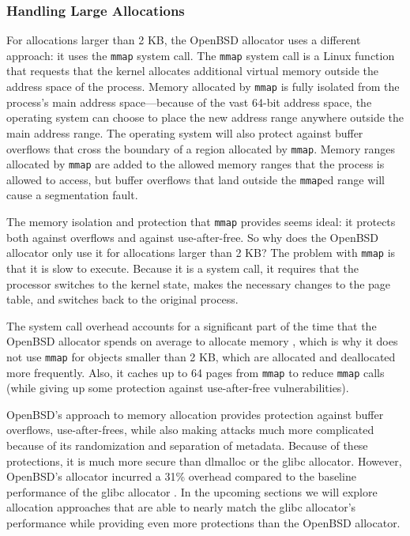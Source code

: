 \documentclass[conference]{IEEEtran}
\begin{document}
\subsubsection{Handling Large Allocations}
For allocations larger than 2 KB, the OpenBSD allocator uses a different approach: it uses the \verb|mmap| system call.
The \verb|mmap| system call is a Linux function that requests that the kernel allocates additional virtual memory outside the address space of the process. \cite{mmap_man_page}
Memory allocated by \verb|mmap| is fully isolated from the process's main address space---because of the vast 64-bit address space, the operating system can choose to place the new address range anywhere outside the main address range.
The operating system will also protect against buffer overflows that cross the boundary of a region allocated by \verb|mmap|.
Memory ranges allocated by \verb|mmap| are added to the allowed memory ranges that the process is allowed to access, but buffer overflows that land outside the \verb|mmap|ed range will cause a segmentation fault.

The memory isolation and protection that \verb|mmap| provides seems ideal: it protects both against overflows and against use-after-free.
So why does the OpenBSD allocator only use it for allocations larger than 2 KB?
The problem with \verb|mmap| is that it is slow to execute.
Because it is a system call, it requires that the processor switches to the kernel state, makes the necessary changes to the page table, and switches back to the original process.

The system call overhead accounts for a significant part of the time that the OpenBSD allocator spends on average to allocate memory \cite{guarder}, which is why it does not use \verb|mmap| for objects smaller than 2 KB, which are allocated and deallocated more frequently.
Also, it caches up to 64 pages from \verb|mmap| \cite{freeguard} to reduce \verb|mmap| calls (while giving up some protection against use-after-free vulnerabilities).

OpenBSD's approach to memory allocation provides protection against buffer overflows, use-after-frees, while also making attacks much more complicated because of its randomization and separation of metadata.
Because of these protections, it is much more secure than dlmalloc or the glibc allocator.
However, OpenBSD's allocator incurred a 31\% overhead compared to the baseline performance of the glibc allocator \cite{guarder}.
In the upcoming sections we will explore allocation approaches that are able to nearly match the glibc allocator's performance while providing even more protections than the OpenBSD allocator.
\end{document}
